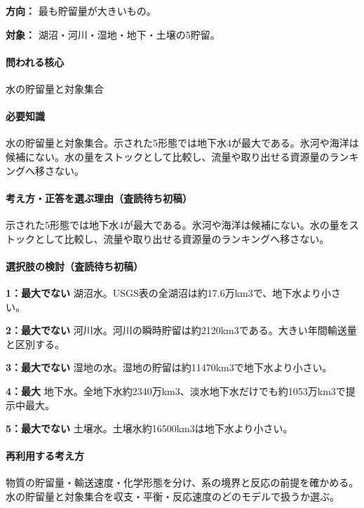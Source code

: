\noindent\textbf{方向：} 最も貯留量が大きいもの。\par

\noindent\textbf{対象：} 湖沼・河川・湿地・地下・土壌の5貯留。\par

\paragraph{問われる核心} 水の貯留量と対象集合

\paragraph{必要知識} 水の貯留量と対象集合。示された5形態では地下水4が最大である。氷河や海洋は候補にない。水の量をストックとして比較し、流量や取り出せる資源量のランキングへ移さない。

\paragraph{考え方・正答を選ぶ理由（査読待ち初稿）} 示された5形態では地下水4が最大である。氷河や海洋は候補にない。水の量をストックとして比較し、流量や取り出せる資源量のランキングへ移さない。

\paragraph{選択肢の検討（査読待ち初稿）}\mbox{}\par

\noindent\textbf{1：最大でない} 湖沼水。USGS表の全湖沼は約17.6万km3で、地下水より小さい。\par

\noindent\textbf{2：最大でない} 河川水。河川の瞬時貯留は約2120km3である。大きい年間輸送量と区別する。\par

\noindent\textbf{3：最大でない} 湿地の水。湿地の貯留は約11470km3で地下水より小さい。\par

\noindent\textbf{4：最大} 地下水。全地下水約2340万km3、淡水地下水だけでも約1053万km3で提示中最大。\par

\noindent\textbf{5：最大でない} 土壌水。土壌水約16500km3は地下水より小さい。\par

\paragraph{再利用する考え方} 物質の貯留量・輸送速度・化学形態を分け、系の境界と反応の前提を確かめる。水の貯留量と対象集合を収支・平衡・反応速度のどのモデルで扱うか選ぶ。

